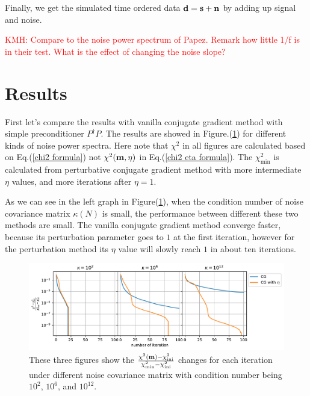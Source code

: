 \documentclass[twocolumn,linenumbers]{aastex631}
\newcommand{\vbd}{\vb{d}}
\newcommand{\vbm}{\vb{m}}
\newcommand{\Pdagger}{P^{\dagger}}
\newcommand{\kmh}[1]{\textcolor{red}{KMH: #1}}
\begin{document}
Finally, we get the simulated time ordered data $\vb{d} = \vb{s} + \vb{n}$ by
adding up signal and noise.

\kmh{Compare to the noise power spectrum of Papez. Remark how little 1/f is in their test.  What is the effect of changing the noise slope?}


\section{Results} \label{sec:results}
First let's compare the results with vanilla conjugate gradient method with
simple preconditioner $\Pdagger P$.
The results are showed in Figure.(\ref{f scan 0.1 CG}) for different kinds
of noise power spectra.
Here note that $\chi^2$ in all figures are calculated based on
Eq.(\ref{chi2 formula})
not $\chi^2(\vbm, \eta)$ in Eq.(\ref{chi2 eta formula}).
The $\chi^2_{\text{min}}$ is calculated from perturbative conjugate gradient
method with more intermediate $\eta$ values, and more iterations after
$\eta=1$.

As we can see in the left graph in Figure(\ref{f scan 0.1 CG}),
when the condition number of noise covariance matrix $\kappa(N)$ is small,
the performance between different these two methods are small.
The vanilla conjugate gradient method converge faster, because its perturbation
parameter goes to $1$ at the first iteration, however for the perturbation method its
$\eta$ value will slowly reach $1$ in about ten iterations.

\begin{figure}[htb!]
\centering
\includegraphics[width=\textwidth]{f_scan=0.1_CG.pdf}
\caption{These three figures show the 
$\frac{\chi^2(\vbm) - \chi^2_\text{ini}}{\chi^2_\text{min} - \chi^2_\text{ini}}$
changes for each iteration under different noise covariance matrix with
condition number being $10^2$, $10^6$, and $10^{12}$.
}
\label{f scan 0.1 CG}
\end{figure}
\end{document}
